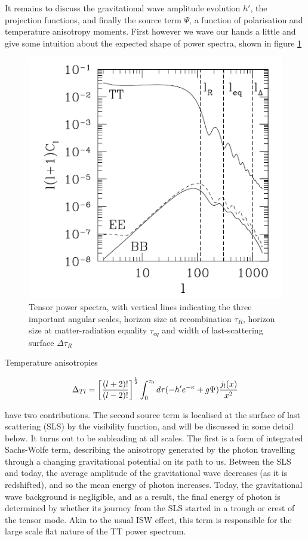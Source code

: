 \documentclass[a4paper,10pt]{article}
\newcommand{\half}{\frac{1}{2}}
\newcommand{\ltwo}{\left[\frac{(l+2)!}{(l-2)!}\right]}
\begin{document}
It remains to discuss the gravitational wave amplitude evolution $h'$, the projection functions, and finally the source term $\Psi$, a function of polarisation and temperature anisotropy moments. First however we wave our hands a little and give some intuition about the expected shape of power spectra, shown in figure \ref{tensorpower}

\begin{figure}[h]
  \includegraphics[width=0.5\linewidth]{tensorpowerspectra.png}
  \centering
  \caption{Tensor power spectra, with vertical lines indicating the three important angular scales, horizon size at recombination $\tau_R$, horizon size at matter-radiation equality $\tau_{eq}$ and width of last-scattering surface $\Delta\tau_R$}
  \label{tensorpower}
\end{figure}


Temperature anisotropies 

\begin{equation}
\Delta_{Tl} = \ltwo^\half \int_0^{\tau_0} d\tau (-h'e^{-\kappa}+g\Psi)\frac{j_l(x)}{x^2}\\
\end{equation}

have two contributions. The second source term is localised at the surface of last scattering (SLS) by the visibility function, and will be discussed in some detail below. It turns out to be subleading at all scales. The first is a form of integrated Sachs-Wolfe term, describing the anisotropy generated by the photon travelling through a changing gravitational potential on its path to us. Between the SLS and today, the average amplitude of the gravitational wave decreases (as it is redshifted), and so the mean energy of photon increases. Today, the gravitational wave background is negligible, and as a result, the final energy of photon is determined by whether its journey from the SLS started in a trough or crest of the tensor mode. Akin to the usual ISW effect, this term is responsible for the large scale flat nature of the TT power spectrum.\\
\end{document}

